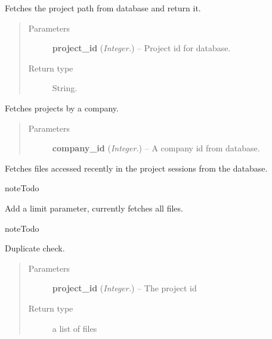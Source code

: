 \documentclass[letterpaper,10pt,english]{sphinxmanual}
\begin{document}
\begin{fulllineitems}
\label{controller:controller.GetProjectPath}
Fetches the project path from database and return it.
\begin{quote}\begin{description}
\item[{Parameters}] \leavevmode
\textbf{project\_id} (\emph{Integer.}) -- Project id for database.

\item[{Return type}] \leavevmode
String.

\end{description}\end{quote}

\end{fulllineitems}


\begin{fulllineitems}
\label{controller:controller.GetProjectsByCompany}
Fetches projects by a company.
\begin{quote}\begin{description}
\item[{Parameters}] \leavevmode
\textbf{company\_id} (\emph{Integer.}) -- A company id from database.

\end{description}\end{quote}

\end{fulllineitems}


\begin{fulllineitems}
\label{controller:controller.GetRecentFiles}
Fetches files accessed recently in the project sessions from the
database.

\begin{notice}{note}{Todo}

Add a limit parameter, currently fetches all files.
\end{notice}

\begin{notice}{note}{Todo}

Duplicate check.
\end{notice}
\begin{quote}\begin{description}
\item[{Parameters}] \leavevmode
\textbf{project\_id} (\emph{Integer.}) -- The project id

\item[{Return type}] \leavevmode
a list of files

\end{description}\end{quote}

\end{fulllineitems}
\end{document}
